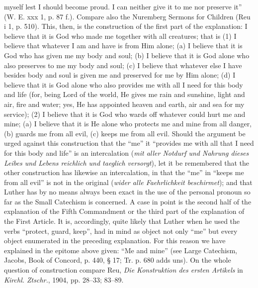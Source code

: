 myself lest I should become proud. I can neither give it to me nor preserve it” (W. E. xxx 1, p. 87 f.). Compare also the Nuremberg Sermons for Children (Reu i 1, p. 510). This, then, is the construction of the first part of the explanation: I believe that it is God who made me together with all creatures; that is (1) I believe that whatever I am and have is from Him alone; (a) I believe that it is God who has given me my body and soul; (b) I believe that it is God alone who also preserves to me my body and soul; (c) I believe that whatever else I have besides body and soul is given me and preserved for me by Him alone; (d) I believe that it is God alone who also provides me with all I need for this body and life (for, being Lord of the world, He gives me rain and sunshine, light and air, fire and water; yes, He has appointed heaven and earth, air and sea for my service); (2) I believe that it is God who wards off whatever could hurt me and mine; (a) I believe that it is He alone who protects me and mine from all danger, (b) guards me from all evil, (c) keeps me from all evil. Should the argument be urged against this construction that the “me” it “provides me with all that I need for this body and life” is an intercalation (\emph{mit aller Notdurf und Nahrung dieses Leibes und Lebens reichlich und taeglich versorgt}), let it be remembered that the other construction has likewise an intercalation, in that the “me” in “keeps me from all evil” is not in the original (\emph{wider alle Faehrlichkeit beschirmet}); and that Luther has by no means always been exact in the use of the personal pronoun so far as the Small Catechism is concerned. A case in point is the second half of the explanation of the Fifth Commandment or the third part of the explanation of the First Article. It is, accordingly, quite likely that Luther when he used the verbs “protect, guard, keep”, had in mind as object not only “me” but every object enumerated in the preceding explanation. For this reason we have explained in the epitome above given: “Me and mine” (see Large Catechism, Jacobs, Book of Concord, p. 440, § 17; Tr. p. 680 adds uns). On the whole question of construction compare Reu, \emph{Die Konstruktion des ersten Artikels} in \emph{Kirchl. Ztschr.}, 1904, pp. 28–33; 83–89.


